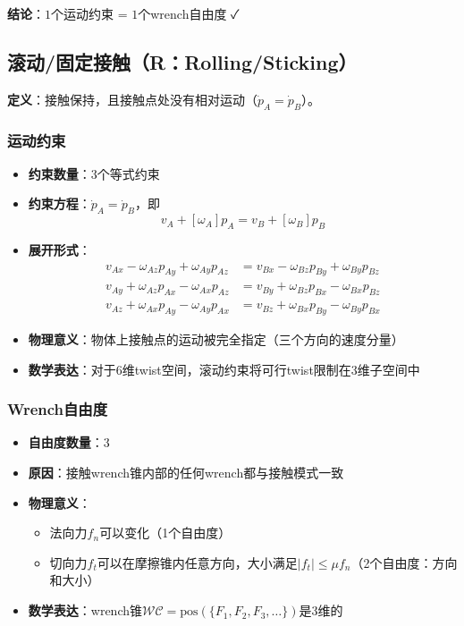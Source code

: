 \documentclass[12pt,a4paper]{article}
\begin{document}
\textbf{结论}：$1$个运动约束 = $1$个wrench自由度 ✓

\subsection{滚动/固定接触（R：Rolling/Sticking）}

\textbf{定义}：接触保持，且接触点处没有相对运动（$\dot{p}_A = \dot{p}_B$）。

\subsubsection{运动约束}

\begin{itemize}
    \item \textbf{约束数量}：3个等式约束
    \item \textbf{约束方程}：$\dot{p}_A = \dot{p}_B$，即
    \begin{equation}
    v_A + [\omega_A]p_A = v_B + [\omega_B]p_B
    \end{equation}
    \item \textbf{展开形式}：
    \begin{align}
    v_{Ax} - \omega_{Az} p_{Ay} + \omega_{Ay} p_{Az} &= v_{Bx} - \omega_{Bz} p_{By} + \omega_{By} p_{Bz} \\
    v_{Ay} + \omega_{Az} p_{Ax} - \omega_{Ax} p_{Az} &= v_{By} + \omega_{Bz} p_{Bx} - \omega_{Bx} p_{Bz} \\
    v_{Az} + \omega_{Ax} p_{Ay} - \omega_{Ay} p_{Ax} &= v_{Bz} + \omega_{Bx} p_{By} - \omega_{By} p_{Bx}
    \end{align}
    \item \textbf{物理意义}：物体上接触点的运动被完全指定（三个方向的速度分量）
    \item \textbf{数学表达}：对于6维twist空间，滚动约束将可行twist限制在3维子空间中
\end{itemize}

\subsubsection{Wrench自由度}

\begin{itemize}
    \item \textbf{自由度数量}：3
    \item \textbf{原因}：接触wrench锥内部的任何wrench都与接触模式一致
    \item \textbf{物理意义}：
    \begin{itemize}
        \item 法向力$f_n$可以变化（1个自由度）
        \item 切向力$f_t$可以在摩擦锥内任意方向，大小满足$|f_t| \leq \mu f_n$（2个自由度：方向和大小）
    \end{itemize}
    \item \textbf{数学表达}：wrench锥$\mathcal{WC} = \text{pos}(\{F_1, F_2, F_3, \ldots\})$是3维的
\end{itemize}
\end{document}
